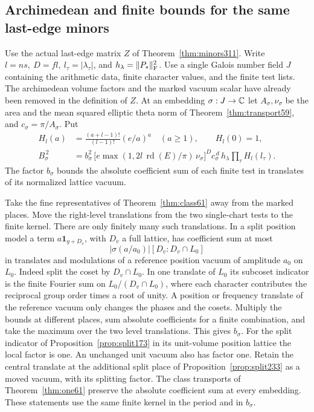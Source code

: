 \documentclass[a4paper,11pt]{article}
\theoremstyle{definition}
\theoremstyle{remark}
\numberwithin{equation}{section}
\begin{document}
\subsection{Archimedean and finite bounds for the same last-edge minors}\label{nav:IX-62}
Use the actual last-edge matrix \(Z\) of Theorem~\ref{thm:minors311}.
Write \(l=ns,\ D=fl,\ l_\tau=|\lambda_\tau|\), and
\(h_\lambda=\|P_*\|_{\rm F}^2\). Use a single Galois number
field \(J\) containing the arithmetic data, finite character
values, and the finite test lists. The archimedean volume
factors and the marked vacuum scalar have already been removed
in the definition of \(Z\). At an embedding \(\sigma:J\to\mathbb C\)
let \(A_\sigma,\nu_\sigma\) be the area and the mean squared
elliptic theta norm of Theorem~\ref{thm:transport59}, and
\(c_\sigma=\pi/A_\sigma\). Put
\[
 \begin{split}
 H_l(a)&=\frac{(a+l-1)!}{(l-1)!}(e/a)^a\quad(a\ge1),
                         \qquad H_l(0)=1,\\
 B_\sigma^{\,2}
   &=b_\sigma^2\,\big[e\max(1,2l\,\operatorname{rd}(E)/\pi)
                     \,\nu_\sigma\big]^D
           c_\sigma^{\,d}\,h_\lambda\prod_\tau H_l(l_\tau).
 \end{split}
\]
The factor \(b_\sigma\) bounds the absolute coefficient sum of
each finite test in translates of its normalized lattice vacuum.

Take the fine representatives of Theorem~\ref{thm:class61}
away from the marked places. Move the right-level translations
from the two single-chart tests to the finite kernel. There
are only finitely many such translations. In a split position
model a term \(a\mathbf1_{y+D_v}\), with \(D_v\) a full lattice,
has coefficient sum at most
\[
             |\sigma(a/a_0)|[D_v:D_v\cap L_0]
\]
in translates and modulations of a reference position vacuum
of amplitude \(a_0\) on \(L_0\). Indeed split the coset by
\(D_v\cap L_0\). In one translate of \(L_0\) its subcoset
indicator is the finite Fourier sum on \(L_0/(D_v\cap L_0)\),
where each character contributes the reciprocal group order times
a root of unity. A position or frequency translate of the
reference vacuum only changes the phases and the cosets.
Multiply the bounds at different places, sum absolute
coefficients for a finite combination, and take the maximum
over the two level translations. This gives \(b_\sigma\).
For the split indicator of Proposition~\ref{prop:split173} in
its unit-volume position lattice the local factor is one.
An unchanged unit vacuum also has factor one. Retain the
central translate at the additional split place of
Proposition~\ref{prop:split233} as a moved vacuum, with its
splitting factor. The class transports of
Theorem~\ref{thm:one61} preserve the absolute coefficient
sum at every embedding. These statements use the same finite
kernel in the period and in \(b_\sigma\).
\end{document}
